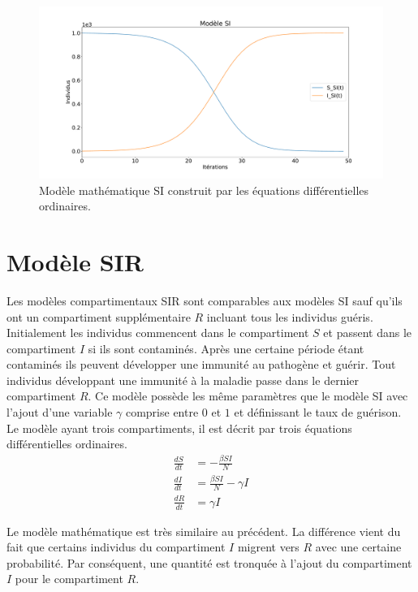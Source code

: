 \begin{figure}[h]
\centering
\captionsetup{justification=centering}
\includegraphics[scale=0.3]{Images/SI_exemple.pdf}
\caption[Modèle mathématique SI]{Modèle mathématique SI construit par les équations différentielles ordinaires.}
\end{figure}

\section{Modèle SIR}

Les modèles compartimentaux SIR sont comparables aux modèles SI sauf qu'ils ont un compartiment supplémentaire $R$ incluant tous les individus guéris. Initialement les individus commencent dans le compartiment $S$ et passent dans le compartiment $I$ si ils sont contaminés. Après une certaine période étant contaminés ils peuvent développer une immunité au pathogène et guérir. Tout individus développant une immunité à la maladie passe dans le dernier compartiment $R$. Ce modèle possède les même paramètres que le modèle SI avec l'ajout d'une variable $\gamma$ comprise entre $0$ et $1$ et définissant le taux de guérison.\\

Le modèle ayant trois compartiments, il est décrit par trois équations différentielles ordinaires.
\begin{align}
    \frac{dS}{dt} &= -\frac{\beta S I}{N}\\
    \frac{dI}{dt} &= \frac{\beta S I}{N} - \gamma I\\
    \frac{dR}{dt} &= \gamma I
\end{align}

Le modèle mathématique est très similaire au précédent. La différence vient du fait que certains individus du compartiment $I$ migrent vers $R$ avec une certaine probabilité. Par conséquent, une quantité est tronquée à l'ajout du compartiment $I$ pour le compartiment $R$.\\

